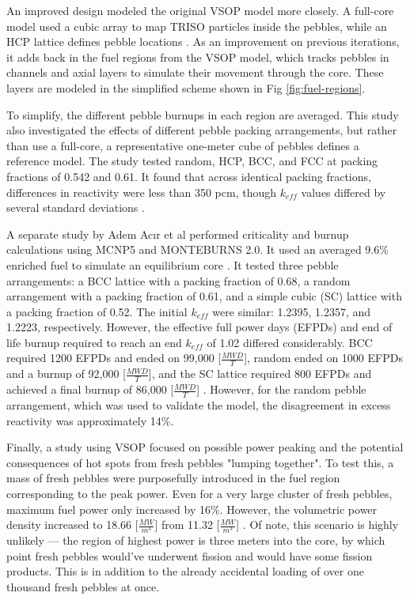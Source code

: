 An improved design modeled the original VSOP model more closely.  A full-core model used a cubic array to map TRISO particles inside the pebbles, while an HCP lattice defines pebble locations \cite{albornoz_mcnp_nodate}.  As an improvement on previous iterations, it adds back in the fuel regions from the VSOP model, which tracks pebbles in channels and axial layers to simulate their movement through the core.  These layers are modeled in the simplified scheme shown in Fig \ref{fig:fuel-regions}.



To simplify, the different pebble burnups in each region are averaged.  This study also investigated the effects of different pebble packing arrangements, but rather than use a full-core, a representative one-meter cube of pebbles defines a reference model.  The study tested random, HCP, BCC, and FCC at packing fractions of 0.542 and 0.61.  It found that across identical packing fractions, differences in reactivity were less than 350 pcm, though $k_{eff}$ values differed by several standard deviations \cite{albornoz_mcnp_nodate}.

A separate study by Adem Acır et al performed criticality and burnup calculations using MCNP5 and MONTEBURNS 2.0.  It used an averaged 9.6\% enriched fuel to simulate an equilibrium core \cite{noauthor_criticality_2011}.  It tested three pebble arrangements:  a BCC lattice with a packing fraction of 0.68, a random arrangement with a packing fraction of 0.61, and a simple cubic (SC) lattice with a packing fraction of 0.52.  The initial $k_{eff}$ were similar: 1.2395, 1.2357, and 1.2223, respectively.  However, the effective full power days (EFPDs) and end of life burnup required to reach an end $k_{eff}$  of 1.02 differed considerably.  BCC required 1200 EFPDs and ended on 99,000 [$\frac{MWD}{T}$], random ended on 1000 EFPDs and a burnup of 92,000 [$\frac{MWD}{T}$], and the SC lattice required 800 EFPDs and achieved a final burnup of 86,000 [$\frac{MWD}{T}$] \cite{noauthor_criticality_2011}.  However, for the random pebble arrangement, which was used to validate the model, the disagreement in excess reactivity was approximately 14\%.

Finally, a study using VSOP focused on possible power peaking and the potential consequences of hot spots \cite{reitsma_investigation_2005} from fresh pebbles "lumping together".  To test this, a mass of fresh pebbles were purposefully introduced in the fuel region corresponding to the peak power.  Even for a very large cluster of fresh pebbles, maximum fuel power only increased by 16\%.  However, the volumetric power density increased to 18.66 [$\frac{MW}{m^3}$] from 11.32 [$\frac{MW}{m^3}$] \cite{reitsma_investigation_2005}.  Of note, this scenario is highly unlikely --- the region of highest power is three meters into the core, by which point fresh pebbles would've underwent fission and would have some fission products.  This is in addition to the already accidental loading of over one thousand fresh pebbles at once.

